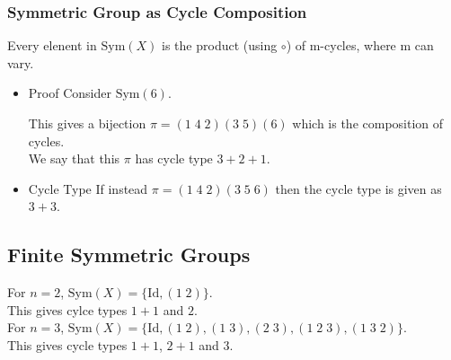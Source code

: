 \documentclass[11pt]{article}
\newcommand{\0}{\emptyset}
\begin{document}
\subsubsection*{Symmetric Group as Cycle Composition}
\label{sec:org6b9b847}
Every elenent in \(\text{Sym}(X)\) is the product (using \(\circ\)) of m-cycles, where m can vary.\\[0pt]
\begin{itemize}
\item Proof
\label{sec:org25609ae}
Consider \(\text{Sym}(6)\).\\[0pt]
This gives a bijection \(\pi = (1\;4\;2)(3\;5)(6)\) which is the composition of cycles.\\[0pt]
We say that this \(\pi\) has cycle type \(3+2+1\).\\[0pt]
\item Cycle Type
\label{sec:orgd4b43b9}
If instead \(\pi=(1\;4\;2)(3\;5\;6)\) then the cycle type is given as \(3+3\).\\[0pt]
\end{itemize}
\subsection*{Finite Symmetric Groups}
\label{sec:orge7ee866}
For \(n=2\), \(\text{Sym}(X)=\{\text{Id},(1\;2)\}\).\\[0pt]
This gives cylce types \(1+1\) and \(2\).\\[0pt]
For \(n=3\), \(\text{Sym}(X)=\{\text{Id},(1\;2),(1\;3),(2\;3),(1\;2\;3),(1\;3\;2)\}\).\\[0pt]
This gives cycle types \(1+1\), \(2+1\) and \(3\).\\[0pt]
\end{document}
